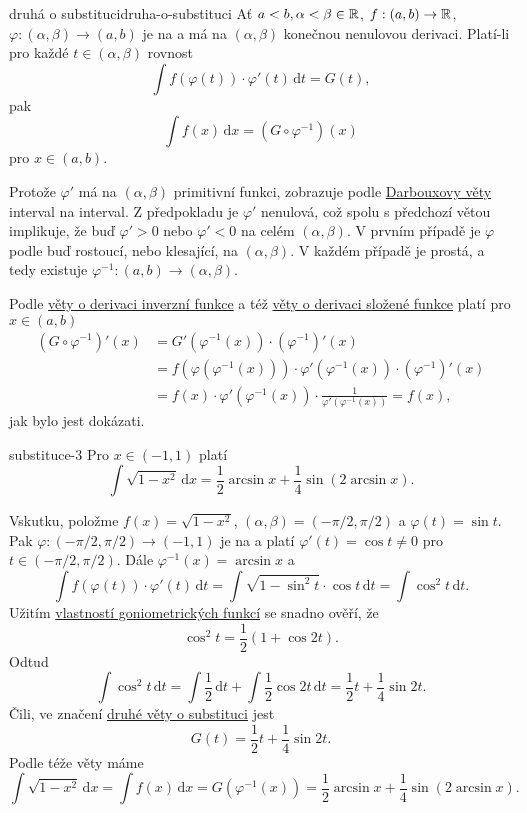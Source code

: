 \begin{theorem}{druhá o substituci}{druha-o-substituci}
 Ať $a < b, \alpha < \beta \in \mathbb{R}$, $f:(a,b) \to \mathbb{R}$, $\varphi:(\alpha,\beta)
 \to (a,b)$ je na a má na $(\alpha,\beta)$ konečnou nenulovou derivaci. Platí-li
 pro každé $t \in (\alpha,\beta)$ rovnost
 \[
  \int f(\varphi(t)) \cdot \varphi'(t) \, \mathrm{d}t = G(t), 
 \]
 pak
 \[
  \int f(x) \, \mathrm{d}x = (G \circ \varphi^{-1})(x)
 \]
 pro $x \in (a,b)$.
\end{theorem}
\begin{thmproof}
 Protože $\varphi'$ má na $(\alpha,\beta)$ primitivní funkci, zobrazuje podle
 \hyperref[thm:darbouxova]{Darbouxovy věty} interval na interval. Z předpokladu
 je $\varphi'$ nenulová, což spolu s předchozí větou implikuje, že buď
 $\varphi'>0$ nebo $\varphi'<0$ na celém $(\alpha,\beta)$. V prvním případě je
 $\varphi$ podle  buď rostoucí,
 nebo klesající, na $(\alpha,\beta)$. V každém případě je prostá, a tedy
 existuje $\varphi^{-1}:(a,b) \to (\alpha,\beta)$.

 Podle \hyperref[thm:derivace-inverzni-funkce]{věty o derivaci inverzní funkce}
 a též \hyperref[thm:derivace-slozene-funkce]{věty o derivaci složené funkce}
 platí pro $x \in (a,b)$
 \begin{align*}
  (G \circ \varphi ^{-1})'(x) &= G'(\varphi ^{-1}(x)) \cdot (\varphi ^{-1})'(x)\\
                              &= f(\varphi(\varphi ^{-1}(x))) \cdot
                              \varphi'(\varphi ^{-1}(x)) \cdot (\varphi
                              ^{-1})'(x)\\
                              &= f(x) \cdot \varphi'(\varphi ^{-1}(x)) \cdot
                              \frac{1}{\varphi'(\varphi ^{-1}(x))} = f(x),
 \end{align*}
 jak bylo jest dokázati.
\end{thmproof}
\begin{example}{}{substituce-3}
 Pro $x \in (-1,1)$ platí
 \[
  \int \sqrt{1-x^2} \, \mathrm{d}x = \frac{1}{2}\arcsin x + \frac{1}{4}\sin(2
  \arcsin x).
 \]

 Vskutku, položme $f(x) = \sqrt{1-x^2}$, $(\alpha,\beta) = (-\pi / 2,\pi / 2)$ a
 $\varphi(t) = \sin t$. Pak $\varphi:(-\pi / 2,\pi / 2) \to (-1,1)$ je na a
 platí $\varphi'(t) = \cos t \neq 0$ pro $t \in (-\pi / 2, \pi / 2)$. Dále
 $\varphi ^{-1}(x) = \arcsin x$ a
 \[
  \int f(\varphi(t)) \cdot \varphi'(t) \, \mathrm{d}t = \int \sqrt{1 - \sin^2
  t} \cdot \cos t \, \mathrm{d}t = \int \cos^2 t \, \mathrm{d}t.
 \]
 Užitím \hyperref[thm:vlastnosti-goniometrickych-funkci]{vlastností
 goniometrických funkcí} se snadno ověří, že
 \[
  \cos^2 t = \frac{1}{2}(1 + \cos 2t).
 \]
 Odtud
 \[
  \int \cos^2 t \, \mathrm{d}t = \int \frac{1}{2} \, \mathrm{d}t + \int
  \frac{1}{2}\cos 2t \, \mathrm{d}t = \frac{1}{2}t + \frac{1}{4}\sin 2t.
 \]
 Čili, ve značení \hyperref[thm:druha-o-substituci]{druhé věty o substituci}
 jest
 \[
  G(t) = \frac{1}{2}t + \frac{1}{4}\sin 2t.
 \]
 Podle téže věty máme 
 \[
  \int \sqrt{1-x^2} \, \mathrm{d}x = \int f(x) \, \mathrm{d}x = G(\varphi
  ^{-1}(x)) = \frac{1}{2}\arcsin x + \frac{1}{4}\sin(2\arcsin x).
 \]
\end{example}

